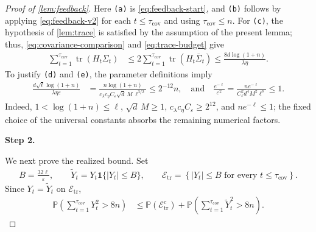 \documentclass[11pt]{article}
\newcommand{\proofstepinline}[1]{%
    {\sffamily\bfseries\color{blue!55!black}Step #1.}\enspace
}
\newcommand{\Pp}{\mathbb P}
\newcommand{\tr}{\operatorname{tr}}
\newcommand{\1}{\mathbf 1}
\newcommand{\eps}{\varepsilon}
\begin{document}
\begin{proof}[Proof of \cref{lem:feedback}]
    Here \texttt{(a)} is \eqref{eq:feedback-start}, and
    \texttt{(b)} follows by applying \eqref{eq:feedback-v2} for each
    $t\leq\tau_{\mathrm{cov}}$ and using $\tau_{\mathrm{cov}}\leq n$.
    For \texttt{(c)}, the hypothesis of \cref{lem:trace} is satisfied by the
    assumption of the present lemma;  thus, \eqref{eq:covariance-comparison}
    and \eqref{eq:trace-budget} give
    \begin{align}
        \sum_{t=1}^{\tau_{\mathrm{cov}}}
        \tr(H_t\Sigma_t)
         & \leq
        2\sum_{t=1}^{\tau_{\mathrm{cov}}}
        \tr(H_t\overline\Sigma_t)
        \leq
        \frac{8d\log(1+n)}{\lambda\eta}.
        \label{eq:feedback-trace}
    \end{align}
    To justify \texttt{(d)} and \texttt{(e)}, the parameter definitions imply
    \begin{align}
        \frac{d\sqrt\ell\log(1+n)}
        {\lambda\eta\eps}
         & =
        \frac{
            n\log(1+n)
        }{
            c_\lambda c_\eta C_\eps
            \sqrt d\,M\,\ell^{3/2}
        }
        \leq
        2^{-12}
        n
        ,\quad\text{and}\quad
        \frac{e^{-\ell}}{\eps^2}
        =
        \frac{
            ne^{-\ell}
        }{
            C_\eps^2d^4M^2\ell^8
        }
        \leq1.
    \end{align}
    Indeed,
    $1<\log(1+n)\leq\ell$,
    $\sqrt d\,M\geq1$,
    $c_\lambda c_\eta C_\eps\geq 2^{12}$, and
    $ne^{-\ell}\leq1$; the fixed choice of the universal constants absorbs
    the remaining numerical factors.

    \proofstepinline{2}
    We next prove the realized bound.  Set
    \begin{align}
        B=\frac{32\ell}{\eps},
        \qquad
        \widetilde Y_t
        =
        Y_t\1\{|Y_t|\leq B\},
        \qquad
        \mathcal E_{\mathrm{tr}}
        =
        \left\{
        |Y_t|\leq B
        \text{ for every }t\leq\tau_{\mathrm{cov}}
        \right\}.
    \end{align}
    Since $Y_t=\widetilde Y_t$ on $\mathcal E_{\mathrm{tr}}$,
    \begin{align}
        \Pp\left(
        \sum_{t=1}^{\tau_{\mathrm{cov}}}Y_t^2
        >8n
        \right)
         & \leq
        \Pp(\mathcal E_{\mathrm{tr}}^c)
        +
        \Pp\left(
        \sum_{t=1}^{\tau_{\mathrm{cov}}}
        \widetilde Y_t^2
        >8n
        \right).
        \label{eq:feedback-realised-start}
    \end{align}


\end{proof}
\end{document}
